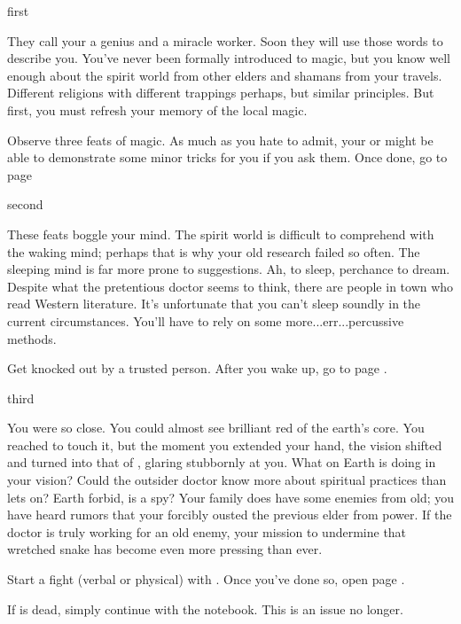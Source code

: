 \documentclass[greennotebook]{Pestilence} %
\begin{document}
\startnotebook{\nApprenticeLab{}}

\begin{page}{first}

They call your \cElder{\parent} a genius and a miracle worker. Soon they will use those words to describe you. You've never been formally introduced to magic, but you know well enough about the spirit world from other elders and shamans from your travels. Different religions with different trappings perhaps, but similar principles. But first, you must refresh your memory of the local magic.

Observe three feats of magic. As much as you hate to admit, your \cElder{\parent} or \cRebel{\sibling} might be able to demonstrate some minor tricks for you if you ask them. Once done, go to page 

\end{page}

\begin{page}{second}

These feats boggle your mind. The spirit world is difficult to comprehend with the waking mind; perhaps that is why your old research failed so often. The sleeping mind is far more prone to suggestions. Ah, to sleep, perchance to dream. Despite what the pretentious doctor seems to think, there are people in town who read Western literature. It's unfortunate that you can't sleep soundly in the current circumstances. You'll have to rely on some more...err...percussive methods.

Get knocked out by a trusted person. After you wake up, go to page .

\end{page}

\begin{page}{third}

You were so close. You could almost see brilliant red of the earth's core. You reached to touch it, but the moment you extended your hand, the vision shifted and turned into that of \cOutsider{}, glaring stubbornly at you. What on Earth is \cOutsider{\they} doing in your vision? Could the outsider doctor know more about spiritual practices than \cOutsider{\they} lets on? Earth forbid, is \cOutsider{\they} a spy? Your family does have some enemies from old; you have heard rumors that your \cElder{\parent} forcibly ousted the previous elder from power. If the doctor is truly working for an old enemy, your mission to undermine that wretched snake has become even more pressing than ever.

Start a fight (verbal or physical) with \cOutsider{}. Once you've done so, open page . 

If \cOutsider{} is dead, simply continue with the notebook. This is an issue no longer.

\end{page}
\end{document}
